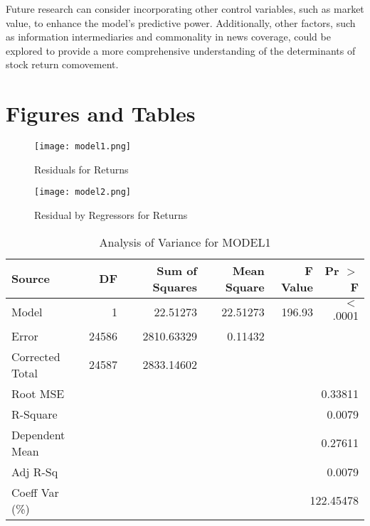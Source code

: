 \documentclass[12pt,english]{article}
\begin{document}
Future research can consider incorporating other control variables, such as market value, to enhance the model's predictive power. Additionally, other factors, such as information intermediaries and commonality in news coverage, could be explored to provide a more comprehensive understanding of the determinants of stock return comovement.










\vfill
\pagebreak{}
\begin{spacing}{1.0}


\end{spacing}

\vfill
\pagebreak{}
\clearpage

\section*{Figures and Tables}\label{sec:figTables}
\begin{figure}[ht]
\centering
\bigskip{}

\texttt{[image: model1.png]}
\caption{Residuals for Returns}
\label{fig:figure1}


\texttt{[image: model2.png]}
\caption{Residual by Regressors for Returns}
\label{fig:figure2}


\end{figure}




\begin{table}[h]
\centering
\caption{Analysis of Variance for MODEL1}
\label{tab:anova}
\begin{tabular}{lrrrrr}
\hline
Source & DF & Sum of Squares & Mean Square & F Value & Pr $>$ F \\
\hline
Model & 1 & 22.51273 & 22.51273 & 196.93 & $<$.0001 \\
Error & 24586 & 2810.63329 & 0.11432 \\
Corrected Total & 24587 & 2833.14602 \\
\hline
Root MSE & \multicolumn{5}{r}{0.33811} \\
R-Square & \multicolumn{5}{r}{0.0079} \\
Dependent Mean & \multicolumn{5}{r}{0.27611} \\
Adj R-Sq & \multicolumn{5}{r}{0.0079} \\
Coeff Var (\%)& \multicolumn{5}{r}{122.45478} \\
\hline
\end{tabular}
\end{table}
\end{document}
